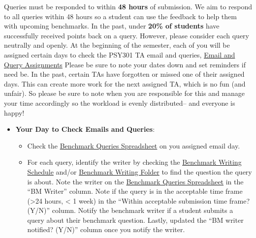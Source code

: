 \documentclass[
]{article}
\providecommand{\tightlist}{%
  \setlength{\itemsep}{0pt}\setlength{\parskip}{0pt}}
\begin{document}
Queries must be responded to within \textbf{48 hours} of submission. We aim to respond to all queries within 48 hours so a student can use the feedback to help them with upcoming benchmarks. In the past, under \textbf{20\% of students} have successfully received points back on a query. However, please consider each query neutrally and openly. At the beginning of the semester, each of you will be assigned certain days to check the PSY301 TA email and queries, \href{https://docs.google.com/spreadsheets/d/1AXT7fqusvnTBZrsaOuhRgZOQ4EmFNt0YmXQNxuAznls/edit?usp=sharing}{Email and Query Assignments} Please be sure to note your dates down and set reminders if need be. In the past, certain TAs have forgotten or missed one of their assigned days. This can create more work for the next assigned TA, which is no fun (and unfair). So please be sure to note when you are responsible for this and manage your time accordingly so the workload is evenly distributed-- and everyone is happy!

\begin{itemize}
\tightlist
\item
  \textbf{Your Day to Check Emails and Queries}:

  \begin{itemize}
  \tightlist
  \item
    Check the \href{https://docs.google.com/spreadsheets/d/157q5gae1Fw06ENQTDr1A2MhT3Q_qqqx4PAqaWady7K8/edit?gid=1566396974\#gid=1566396974}{Benchmark Queries Spreadsheet} on you assigned email day.\\
  \item
    For each query, identify the writer by checking the \href{https://docs.google.com/spreadsheets/d/1hingHbcfSHpUr1Km8NF4nnrDgw5ivD6b/edit?gid=602524248\#gid=602524248}{Benchmark Writing Schedule} and/or \href{https://drive.google.com/drive/folders/1TBohqmI-Khge4n4NfeWAjVi5rFwVx2D6?usp=drive_link}{Benchmark Writing Folder} to find the question the query is about. Note the writer on the \href{https://docs.google.com/spreadsheets/d/157q5gae1Fw06ENQTDr1A2MhT3Q_qqqx4PAqaWady7K8/edit?gid=1566396974\#gid=1566396974}{Benchmark Queries Spreadsheet} in the ``BM Writer'' column. Note if the query is in the acceptable time frame (\textgreater24 hours, \textless{} 1 week) in the ``Within acceptable submission time frame? (Y/N)'' column. Notify the benchmark writer if a student submits a query about their benchmark question. Lastly, updated the ``BM writer notified? (Y/N)'' column once you notify the writer.
  \end{itemize}
\end{itemize}
\end{document}
